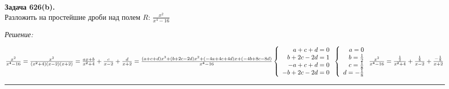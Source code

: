 \documentclass[a4paper, 12pt]{article}
\newenvironment{problem}[2][Задача]
    { \begin{mdframed}[backgroundcolor=gray!10] \textbf{#1 #2.} \\}
    {  \end{mdframed}}
\newenvironment{solution}
    {\textit{Решение: }}
    {\noindent\rule{7in}{1.5pt}}
\begin{document}
\begin{problem}{626(b)}
Разложить на простейшие дроби над полем $R$:
$\frac{x^2}{x^4-16}$
\end{problem}
\begin{solution}

$
\frac{x^2}{x^4-16} = \frac{x^2}{(x^2+4)(x - 2)(x + 2)} =
\frac{ax + b}{x^2+4} + \frac{c}{x - 2} + \frac{d}{x + 2} =
\frac{(a+c+d)x^3 + (b+2c-2d)x^2 + (-4a+4c+4d)x + (-4b+8c-8d)}{x^4-16} \\
\left\{
  \begin{array}{rrrr}
    a + c + d = 0 \\
    b + 2c -2d = 1 \\
    -a + c + d = 0 \\
    -b + 2c - 2d = 0
  \end{array}
\right.
\left\{
  \begin{array}{rrrr}
    a = 0 \\
    b = \frac{1}{2} \\
    c = \frac{1}{8} \\
    d = -\frac{1}{8}
  \end{array}
\right. \\
\frac{x^2}{x^4-16} =
\frac{\frac{1}{2}}{x^2+4} + \frac{\frac{1}{8}}{x - 2} + \frac{-\frac{1}{8}}{x + 2}
$

\end{solution}
\end{document}
